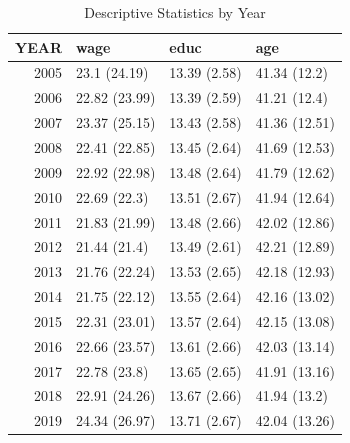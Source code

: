 \begin{table}[ht]
\centering
\begin{tabular}{rlll}
  \hline
YEAR & wage & educ & age \\ 
  \hline
2005 & 23.1 (24.19) & 13.39 (2.58) & 41.34 (12.2) \\ 
  2006 & 22.82 (23.99) & 13.39 (2.59) & 41.21 (12.4) \\ 
  2007 & 23.37 (25.15) & 13.43 (2.58) & 41.36 (12.51) \\ 
  2008 & 22.41 (22.85) & 13.45 (2.64) & 41.69 (12.53) \\ 
  2009 & 22.92 (22.98) & 13.48 (2.64) & 41.79 (12.62) \\ 
  2010 & 22.69 (22.3) & 13.51 (2.67) & 41.94 (12.64) \\ 
  2011 & 21.83 (21.99) & 13.48 (2.66) & 42.02 (12.86) \\ 
  2012 & 21.44 (21.4) & 13.49 (2.61) & 42.21 (12.89) \\ 
  2013 & 21.76 (22.24) & 13.53 (2.65) & 42.18 (12.93) \\ 
  2014 & 21.75 (22.12) & 13.55 (2.64) & 42.16 (13.02) \\ 
  2015 & 22.31 (23.01) & 13.57 (2.64) & 42.15 (13.08) \\ 
  2016 & 22.66 (23.57) & 13.61 (2.66) & 42.03 (13.14) \\ 
  2017 & 22.78 (23.8) & 13.65 (2.65) & 41.91 (13.16) \\ 
  2018 & 22.91 (24.26) & 13.67 (2.66) & 41.94 (13.2) \\ 
  2019 & 24.34 (26.97) & 13.71 (2.67) & 42.04 (13.26) \\ 
   \hline
\end{tabular}
\caption{Descriptive Statistics by Year} 
\label{tab:desc_year}
\end{table}

